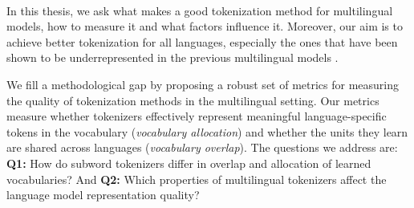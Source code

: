 

~

In this thesis, we ask what makes a good tokenization method for multilingual models, how to measure it and what factors influence it. Moreover, our aim is to achieve better tokenization for all languages, especially the ones that have been shown to be underrepresented in the previous multilingual models \cite{rust_how_2021}. 

We fill a methodological gap by proposing a robust set of metrics for measuring the quality of tokenization methods in the multilingual setting. Our metrics measure whether tokenizers effectively represent meaningful language-specific tokens in the vocabulary (\textit{vocabulary allocation}) and whether the units they learn are shared across languages (\textit{vocabulary overlap}). The questions we address are: \textbf{Q1:} How do subword tokenizers differ in overlap and allocation of learned vocabularies? And \textbf{Q2:} Which properties of multilingual tokenizers affect the language model representation quality?

